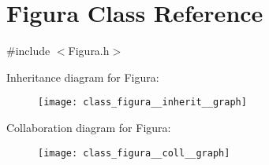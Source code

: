 \hypertarget{class_figura}{\section{Figura Class Reference}
\label{class_figura}
}


{\ttfamily \#include $<$Figura.\+h$>$}



Inheritance diagram for Figura\+:
\nopagebreak
\begin{figure}[H]
\begin{center}
\leavevmode
\texttt{[image: class\_figura\_\_inherit\_\_graph]}
\end{center}
\end{figure}


Collaboration diagram for Figura\+:
\nopagebreak
\begin{figure}[H]
\begin{center}
\leavevmode
\texttt{[image: class\_figura\_\_coll\_\_graph]}
\end{center}
\end{figure}
